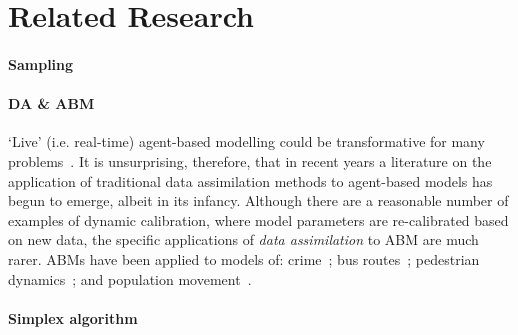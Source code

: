 \section{Related Research}\label{sec:background}

\paragraph{Sampling}


\paragraph{DA \& ABM}

`Live' (i.e. real-time) agent-based modelling could be transformative for many problems~\cite{swarup_live_2020}. It is unsurprising, therefore, that in recent years a literature on the application of traditional data assimilation methods to agent-based models has begun to emerge, albeit in its infancy. Although there are a reasonable number of examples of dynamic calibration, where model parameters are re-calibrated based on new data, the specific applications of \textit{data assimilation} to ABM are much rarer. ABMs have been applied to models of:
crime~\cite{lloyd_exploring_2016};
bus routes~\cite{kieu_dealing_2020};
pedestrian dynamics~\cite{wang_data_2015, ward_dynamic_2016, clay_realtime_2020, malleson_simulating_2020};
and population movement~\cite{lueck_who_2019}.



\paragraph{Simplex algorithm}


